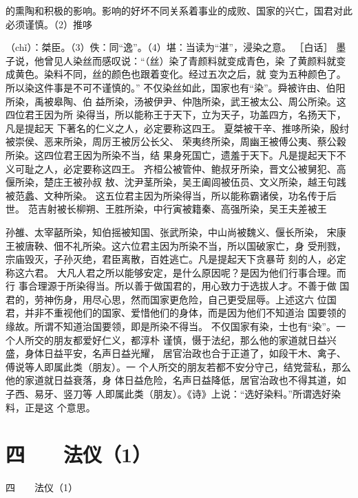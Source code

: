 \documentclass[12pt,UTF8]{ctexbook}
\begin{document}
的熏陶和积极的影响。影响的好坏不同关系着事业的成败、国家的兴亡，国君对此必须谨慎。（2）推哆 

（chǐ）：桀臣。（3）佚：同“逸”。（4）堪：当读为“湛”，浸染之意。 
［白话］ 
墨子说，他曾见人染丝而感叹说：“（丝）染了青颜料就变成青色，染 
了黄颜料就变成黄色。染料不同，丝的颜色也跟着变化。经过五次之后，就 
变为五种颜色了。所以染这件事是不可不谨慎的。” 
不仅染丝如此，国家也有“染”。舜被许由、伯阳所染，禹被皋陶、伯 
益所染，汤被伊尹、仲虺所染，武王被太公、周公所染。这四位君王因为所 
染得当，所以能称王于天下，立为天子，功盖四方，名扬天下，凡是提起天 
下著名的仁义之人，必定要称这四王。 
夏桀被干辛、推哆所染，殷纣被崇侯、恶来所染，周厉王被厉公长父、 
荣夷终所染，周幽王被傅公夷、蔡公穀所染。这四位君王因为所染不当，结 
果身死国亡，遗羞于天下。凡是提起天下不义可耻之人，必定要称这四王。 
齐桓公被管仲、鲍叔牙所染，晋文公被舅犯、高偃所染，楚庄王被孙叔 
敖、沈尹茎所染，吴王阖闾被伍员、文义所染，越王句践被范蠡、文种所染。 
这五位君主因为所染得当，所以能称霸诸侯，功名传于后世。 
范吉射被长柳朔、王胜所染，中行寅被籍秦、高强所染，吴王夫差被王 

孙雒、太宰嚭所染，知伯摇被知国、张武所染，中山尚被魏义、偃长所染， 
宋康王被唐鞅、佃不礼所染。这六位君主因为所染不当，所以国破家亡，身 
受刑戮，宗庙毁灭，子孙灭绝，君臣离散，百姓逃亡。凡是提起天下贪暴苛 
刻的人，必定称这六君。 
大凡人君之所以能够安定，是什么原因呢？是因为他们行事合理。而行 
事合理源于所染得当。所以善于做国君的，用心致力于选拔人才。不善于做 
国君的，劳神伤身，用尽心思，然而国家更危险，自己更受屈辱。上述这六 
位国君，并非不重视他们的国家、爱惜他们的身体，而是因为他们不知道治 
国要领的缘故。所谓不知道治国要领，即是所染不得当。 
不仅国家有染，士也有“染”。一个人所交的朋友都爱好仁义，都淳朴 
谨慎，慑于法纪，那么他的家道就日益兴盛，身体日益平安，名声日益光耀， 
居官治政也合于正道了，如段干木、禽子、傅说等人即属此类（朋友）。一 
个人所交的朋友若都不安分守己，结党营私，那么他的家道就日益衰落，身 
体日益危险，名声日益降低，居官治政也不得其道，如子西、易牙、竖刀等 
人即属此类（朋友）。《诗》上说：“选好染料。”所谓选好染料，正是这 
个意思。 



\chapter{四　　法仪（1）}
四　　法仪（1）
\end{document}
